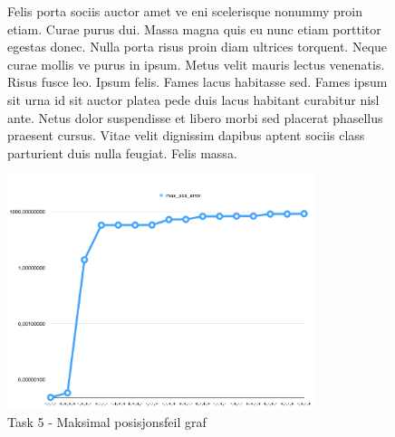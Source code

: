 \begin{figure}
		\vspace{20 mm}
		\begin{minipage}{.5\textwidth}
			Felis porta sociis auctor amet ve eni scelerisque nonummy proin etiam. Curae purus dui. Massa magna quis eu nunc etiam porttitor egestas donec. Nulla porta risus proin diam ultrices torquent. Neque curae mollis ve purus in ipsum. Metus velit mauris lectus venenatis. Risus fusce leo. Ipsum felis. Fames lacus habitasse sed. Fames ipsum sit urna id sit auctor platea pede duis lacus habitant curabitur nisl ante. Netus dolor suspendisse et libero morbi sed placerat phasellus praesent cursus. Vitae velit dignissim dapibus aptent sociis class parturient duis nulla feugiat. Felis massa.
		\end{minipage}

		\centering
		\includegraphics[width=0.8\textwidth]{sections/Exercise5/max_pos_error_graph.png}
		    \caption{Task 5 - Maksimal posisjonsfeil graf}
		    \label{fig:task5max_pos_error_graph}
	\end{figure}

% 